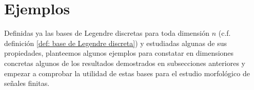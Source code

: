 \section{Ejemplos}
\label{sec: ejemplos}


Definidas ya las bases de Legendre discretas
para toda dimensión $n$ 
(c.f. definición  
\ref{def: base de Legendre discreta}) y estudiadas algunas de sus 
propiedades, planteemos algunos ejemplos
para constatar en dimensiones concretas algunos de los
resultados demostrados en subsecciones anteriores
y empezar a comprobar la utilidad de estas bases para el 
estudio morfológico de señales finitas.


